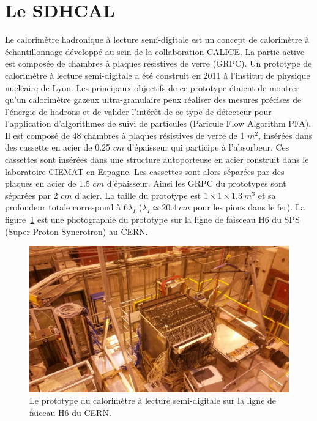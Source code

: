\section{Le SDHCAL}
Le calorimètre hadronique à lecture semi-digitale est un concept de calorimètre à échantillonnage développé au sein de la collaboration CALICE. La partie active est composée de chambres à plaques résistives de verre (GRPC). Un prototype de calorimètre à lecture semi-digitale a été construit en 2011 à l’institut de physique nucléaire de Lyon. Les principaux objectifs de ce prototype étaient de montrer qu'un calorimètre gazeux ultra-granulaire peux réaliser des mesures précises de l'énergie de hadrons et de valider l'intérêt de ce type de détecteur pour l'application d'algorithmes de suivi de particules (Paricule Flow Algorithm PFA). Il est composé de 48 chambres à plaques résistives de verre  de 1 $m^2$, insérées dans des cassette en acier de 0.25 $cm$ d'épaisseur qui participe à l'absorbeur. Ces cassettes sont insérées dans une structure autoporteuse en acier construit dans le laboratoire CIEMAT en Espagne. Les cassettes sont alors séparées par des plaques en acier de 1.5 $cm$ d'épaisseur. Ainsi les GRPC du prototypes sont séparées par 2 $cm$ d'acier. La taille du prototype est $1\times1\times1.3~m^3$ et sa profondeur totale correspond à 6$\lambda_I$ ($\lambda_I\simeq20.4~cm$ pour les pions dans le fer). La figure~\ref{fig:proto} est une photographie du prototype sur la ligne de faisceau H6 du SPS (Super Proton Syncrotron) au CERN.
\begin{figure}[!h]
  \begin{center}
    \includegraphics[width=.8\textwidth]{SDHCAL/figs/proto.jpg}
    \caption{Le prototype du calorimètre à lecture semi-digitale sur la ligne de faiceau H6 du CERN.}
    \label{fig:proto}
  \end{center}
\end{figure}
%
